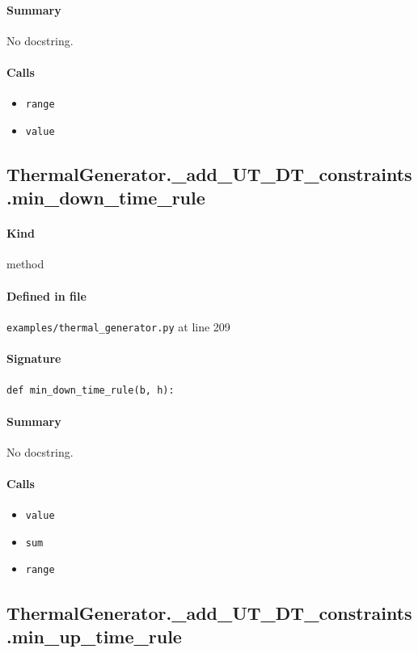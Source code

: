 \documentclass[11pt]{report}
\begin{document}
\paragraph{Summary} No docstring.
\paragraph{Calls}
\begin{itemize}[leftmargin=*]
  \item \texttt{range}
  \item \texttt{value}
\end{itemize}
\subsection{ThermalGenerator.\_add\_UT\_DT\_constraints.min\_down\_time\_rule}
\label{def:examples-thermal_generator.py:ThermalGenerator._add_UT_DT_constraints.min_down_time_rule:L209}
\paragraph{Kind} method
\paragraph{Defined in file} \texttt{examples/thermal\_generator.py} at line 209
\paragraph{Signature} \texttt{def min\_down\_time\_rule(b, h):}
\paragraph{Summary} No docstring.
\paragraph{Calls}
\begin{itemize}[leftmargin=*]
  \item \texttt{value}
  \item \texttt{sum}
  \item \texttt{range}
\end{itemize}
\subsection{ThermalGenerator.\_add\_UT\_DT\_constraints.min\_up\_time\_rule}
\label{def:examples-thermal_generator.py:ThermalGenerator._add_UT_DT_constraints.min_up_time_rule:L230}
\end{document}
